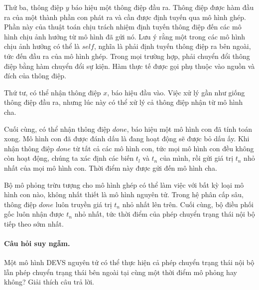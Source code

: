 Thứ ba, thông điệp $y$ báo hiệu một thông điệp đầu ra. Thông điệp được hàm đầu ra của một thành phần con phát ra và cần được định tuyến qua mô hình ghép. Phần này của thuật toán chịu trách nhiệm định tuyến thông điệp đến các mô hình chịu ảnh hưởng từ mô hình đã gửi nó. Lưu ý rằng một trong các mô hình chịu ảnh hưởng có thể là $self$, nghĩa là phải định tuyến thông điệp ra bên ngoài, tức đến đầu ra của mô hình ghép. Trong mọi trường hợp, phải chuyển đổi thông điệp bằng hàm chuyển đổi sự kiện. Hàm thực tế được gọi phụ thuộc vào nguồn và đích của thông điệp.

Thứ tư, có thể nhận thông điệp $x$, báo hiệu đầu vào. Việc xử lý gần như giống thông điệp đầu ra, nhưng lúc này có thể xử lý cả thông điệp nhận từ mô hình cha.

Cuối cùng, có thể nhận thông điệp $done$, báo hiệu một mô hình con đã tính toán xong. Mô hình con đã được đánh dấu là đang hoạt động sẽ được bỏ dấu ấy. Khi nhận thông điệp $done$ từ tất cả các mô hình con, tức mọi mô hình con đều không còn hoạt động, chúng ta xác định các biến $t_l$ và $t_n$ của mình, rồi gửi giá trị $t_n$ nhỏ nhất của mọi mô hình con. Thời điểm này được gửi đến mô hình cha.

Bộ mô phỏng trừu tượng cho mô hình ghép có thể làm việc với bất kỳ loại mô hình con nào, không nhất thiết là mô hình nguyên tử. Trong hệ phân cấp sâu, thông điệp $done$ luôn truyền giá trị $t_n$ nhỏ nhất lên trên. Cuối cùng, bộ điều phối gốc luôn nhận được $t_n$ nhỏ nhất, tức thời điểm của phép chuyển trạng thái nội bộ tiếp theo sớm nhất.

\paragraph{Câu hỏi suy ngẫm.} Một mô hình DEVS nguyên tử có thể thực hiện cả phép chuyển trạng thái nội bộ lẫn phép chuyển trạng thái bên ngoài tại cùng một thời điểm mô phỏng hay không? Giải thích câu trả lời.

